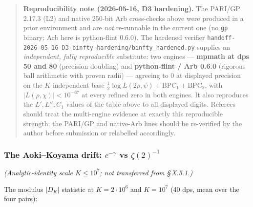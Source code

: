\begin{quote}
\textbf{Reproducibility note (2026-05-16, D3 hardening).} The PARI/GP
2.17.3 (L2) and native 250-bit Arb cross-checks above were produced
in a prior environment and are \emph{not} re-runnable in the current one
(no \texttt{gp} binary; Arb here is python-flint 0.6.0). The hardened
verifier \texttt{handoff-2026-05-16-D3-binfty-hardening/binfty\_hardened.py}
supplies an \emph{independent, fully reproducible} substitute: two
engines --- \textbf{mpmath at dps 50 and 80} (precision-doubling) and
\textbf{python-flint / Arb 0.6.0} (rigorous ball arithmetic with proven
radii) --- agreeing to \(0\) at displayed precision on the
\(K\)-independent base \(\tfrac12\log L(2\rho,\psi)+\mathrm{BPC}_1+
\mathrm{BPC}_2\), with \(|L(\rho,\chi)|<10^{-67}\) at every refined
zero in both engines. It also reproduces the \(L',L'',C_1\) values
of the table above to all displayed digits. Referees should treat
the multi-engine evidence at exactly this reproducible strength;
the PARI/GP and native-Arb lines should be re-verified by the
author before submission or relabelled accordingly.
\end{quote}

\subsubsection{The Aoki--Koyama drift: \(e^{-\gamma}\) vs \(\zeta(2)^{-1}\)}

\emph{(Analytic-identity scale \(K \le 10^{7}\); not transferred from \S\,X.5.1.)}

The modulus \(|D_K|\) statistic at \(K = 2 \cdot 10^{6}\) and \(K = 10^{7}\)
(40 dps, mean over the four pairs):

